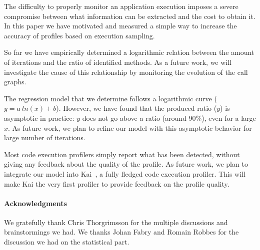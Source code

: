 \documentclass{sig-alternate}
\begin{document}
The difficulty to properly monitor an application execution imposes a severe compromise between what information can be extracted and the cost to obtain it. In this paper we have motivated and measured a simple way to increase the accuracy of profiles based on execution sampling.

So far we have empirically determined a logarithmic relation between the amount of iterations and the ratio of identified methods. As a future work, we will investigate the cause of this relationship by monitoring the evolution of the call graphs.

The regression model that we determine follows a logarithmic curve ($y = a~ln(x) + b$). However, we have found that the produced ratio ($y$) is asymptotic in practice: $y$ does not go above a ratio (around 90\%), even for a large $x$. As future work, we plan to refine our model with this asymptotic behavior for large number of iterations.

Most code execution profilers simply report what has been detected, without giving any feedback about the quality of the profile.  As future work, we plan to integrate our model into Kai~\cite{Berg11f}, a fully fledged code execution profiler. This will make Kai the very first profiler to provide feedback on the profile quality.

\paragraph{Acknowledgments} 
We gratefully thank Chris Thorgrimsson for the multiple discussions and brainstormings we had. We thanks Johan Fabry and Romain Robbes for the discussion we had on the statistical part.





%
\end{document}
